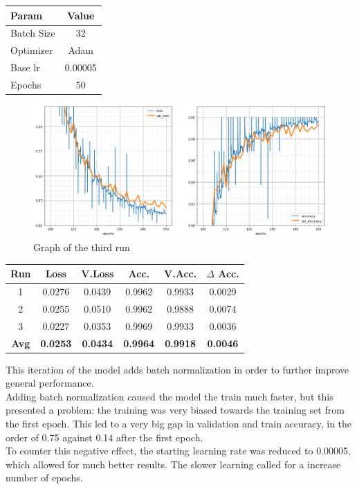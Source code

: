 \begin{table}[H]
	\centering
	\begin{tabular}{lc}
	\textbf{Param} & \textbf{Value}\\ \hline
	Batch Size 	& 32 \\
	Optimizer 	& Adam \\
	Base lr		& 0.00005 \\
	Epochs		& 50 \\
	\end{tabular}
\end{table}


\begin{figure}[H]
	\begin{center}
	\includegraphics[width=\linewidth]{Immagini/bn}
	\caption{Graph of the third run}
	\end{center}
\end{figure}
\begin{table}[H]
	\centering
	\begin{tabular}{cccccc}
		\textbf{Run} &\textbf{Loss}&\textbf{V.Loss} &\textbf{Acc.}&\textbf{V.Acc.}&\textbf{$\Delta$ Acc.} \\ \hline
	1   & 0.0276    & 0.0439    & 0.9962    & 0.9933    & 0.0029\\
	2   & 0.0255    & 0.0510    & 0.9962    & 0.9888    & 0.0074\\
	3   & 0.0227    & 0.0353    & 0.9969    & 0.9933    & 0.0036\\
	\textbf{Avg} & \textbf{0.0253}    & \textbf{0.0434}    & \textbf{0.9964}    & \textbf{0.9918}    & \textbf{0.0046}\\ 
	\end{tabular}
\end{table}

This iteration of the model adds batch normalization in order to further improve general performance.\\
Adding batch normalization caused the model the train much faster, but this presented a problem: the training was very biased towards the training set from the first epoch. This led to a very big gap in validation and train accuracy, in the order of 0.75 against 0.14 after the first epoch.\\
To counter this negative effect, the starting learning rate was reduced to 0.00005, which allowed for much better results. The slower learning called for a increase number of epochs.




